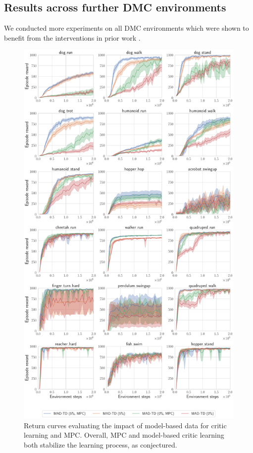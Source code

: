 \subsection{Results across further DMC environments}
\label{app:results_further}

We conducted more experiments on all DMC environments which were shown to benefit from the interventions in prior work \parencite{doro2023barrier,nauman2024bigger}.

\begin{figure}[h]
    \centering
    \includegraphics[width=0.8\linewidth]{figures/mad-td/model_impact.pdf}
    \caption{Return curves evaluating the impact of model-based data for critic learning and MPC. Overall, MPC and model-based critic learning both stabilize the learning process, as conjectured.}
    \label{fig:all_model_impact}
\end{figure}

